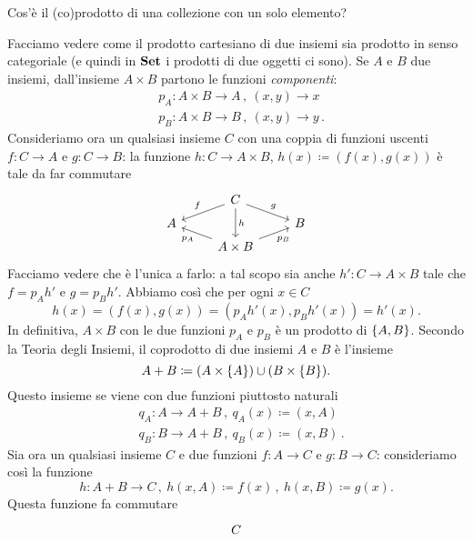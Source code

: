 \begin{esercizio}
Cos'è il (co)prodotto di una collezione con un solo elemento?
\end{esercizio}

\begin{esempio}
Facciamo vedere come il prodotto cartesiano di due insiemi sia prodotto in senso categoriale (e quindi in \(\mathbf{Set}\) i prodotti di due oggetti ci sono).\newline
Se \(A\) e \(B\) due insiemi, dall'insieme \(A \times B\) partono le funzioni {\em componenti}:
\begin{align*}
& p_A : A \times B \to A\,, \ (x, y) \to x \\
& p_B : A \times B \to B\,, \ (x, y) \to y\,.
\end{align*}
Consideriamo ora un qualsiasi insieme \(C\) con una coppia di funzioni uscenti \(f : C \to A\) e \(g : C \to B\): la funzione \(h : C \to A \times B\), \(h(x) \coloneq (f(x), g(x))\) è tale da far commutare
\[\begin{tikzcd}[row sep=tiny]
  & C \ar["f", dl, swap] \ar["g", dr] \ar["h", dd]     &   \\
A &                                                    & B \\
  & A \times B \ar["{p_A}", ul] \ar["{p_B}", ur, swap] &
\end{tikzcd}\]
Facciamo vedere che è l'unica a farlo: a tal scopo sia anche \(h' : C \to A \times B\) tale che \(f = p_A h'\) e \(g = p_B h'\). Abbiamo così che per ogni \(x \in C\)
\[h(x) = (f(x), g(x)) = (p_A h'(x),p_B h'(x)) = h'(x).\]
In definitiva, \(A \times B\) con le due funzioni \(p_A\) e \(p_B\) è un prodotto di \(\left\{A, B\right\}\).\newline
Secondo la Teoria degli Insiemi, il coprodotto di due insiemi \(A\) e \(B\) è l'insieme
\[A + B \coloneq (A \times \left\{A\right\}) \cup (B \times \left\{B\right\}).\]
Questo insieme se viene con due funzioni piuttosto naturali
\begin{align*}
& q_A : A \to A+B\,, \ q_A(x) \coloneq (x, A) \\
& q_B : B \to A+B\,, \ q_B(x) \coloneq (x, B)\,.
\end{align*}
Sia ora un qualsiasi insieme \(C\) e due funzioni \(f : A \to C\) e \(g : B \to C\): consideriamo così la funzione
\[h : A+B \to C\,, \ h(x, A) \coloneq f(x)\,, \ h(x, B) \coloneq g(x).\]
Questa funzione fa commutare
\[\begin{tikzcd}[row sep=tiny]
                                      & C                & \\

\end{tikzcd}\]
\end{esempio}
